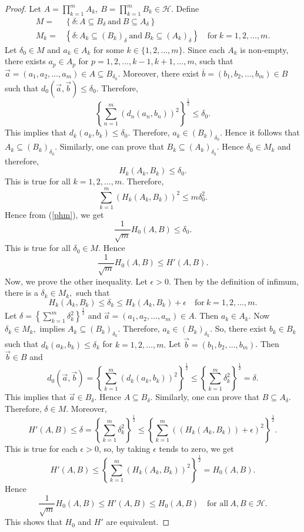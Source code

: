 \documentclass[10pt]{amsart}
\theoremstyle{definition}
\begin{document}
	\begin{proof}
		Let $A=\prod_{k=1}^mA_k,~B=\prod_{k=1}^mB_k\in \mathscr{H}$. Define
		\begin{align*}
			M=&\left\{\delta : A\subseteq B_\delta~\mbox{and}~B\subseteq A_\delta\right\}\\
			M_k=&\left\{\delta : A_k\subseteq (B_k)_\delta~\mbox{and}~B_k\subseteq (A_k)_\delta\right\}\quad \mbox{for}~k=1,2,\ldots,m.
		\end{align*}
		Let $\delta_0\in M$ and $a_k\in A_k$ for some $k\in\{1,2,\ldots,m\}.$ Since each $A_k$ is non-empty,  there exists $a_p\in A_p$ for $p=1,2,\ldots,k-1,k+1,\ldots,m$, such that $\vec{a}=(a_1,a_2,\ldots,a_m)\in A\subseteq B_{\delta_0}$. Moreover, there exist $\overline{b}=(b_1,b_2,\ldots,b_m)\in B$ such that $d_0(\vec{a},\vec{b})\leq \delta_0.$ Therefore,
		$$\left\{\sum_{n=1}^{m}(d_n(a_n,b_n))^2\right \}^{\frac{1}{2}}\leq\delta_0.$$
		This implies that $d_k(a_k,b_k)\leq\delta_0.$ Therefore, $a_k\in(B_k)_{\delta_0}$. Hence it follows that $A_k\subseteq (B_k)_{\delta_0}$. Similarly, one can prove that $B_k\subseteq (A_k)_{\delta_0}$. Hence $\delta_0\in M_k$ and therefore, $$H_k(A_k,B_k)\leq \delta_0.$$ This is true for all $k=1,2,\ldots,m.$ Therefore, $$\sum_{k=1}^{m}(H_k(A_k,B_k))^2\leq m\delta_0^2.$$ Hence from (\ref{phm}), we get $$\frac{1}{\sqrt{m}}H_0(A,B)\leq\delta_0.$$ This is true for all $\delta_0\in M$. Hence
		$$\frac{1}{\sqrt{m}}H_0(A,B)\leq H'(A,B).$$
		Now, we prove the other inequality. Let $\epsilon>0.$ Then by the definition of infimum, there is a $\delta_k\in M_k,$ such that $$H_k(A_k,B_k)\leq\delta_k\leq H_k(A_k,B_k)+\epsilon\quad \mbox{for}~ k=1,2,\ldots,m.$$
		Let $\delta=\left\{\sum_{k=1}^m\delta_k^2\right\}^{\frac{1}{2}}$ and  $\vec{a}=(a_1,a_2,\ldots,a_m)\in A$. Then $a_k\in A_k$. Now $\delta_k\in M_k,$ implies $A_k\subseteq (B_k)_{\delta_k}$. Therefore, $a_k\in (B_k)_{\delta_k}$. So, there exist $b_k\in B_k$ such that $d_k(a_k,b_k)\leq \delta_k$ for $k=1,2,\ldots,m.$ Let $\vec{b}=(b_1,b_2,\ldots,b_m)$. Then $\vec{b}\in B$ and $$d_0(\vec{a},\vec{b})=\left\{\sum_{k=1}^{m}(d_k(a_k,b_k))^2\right \}^{\frac{1}{2}}\leq \left\{\sum_{k=1}^m\delta_k^2\right\}^{\frac{1}{2}}=\delta.$$ This implies that $\vec{a}\in B_\delta$. Hence $A\subseteq B_\delta$. Similarly, one can prove that $B\subseteq A_\delta.$ Therefore, $\delta\in M.$ Moreover, $$H'(A,B)\leq\delta=\left\{\sum_{k=1}^m\delta_k^2\right\}^{\frac{1}{2}}\leq \left\{\sum_{k=1}^{m}((H_k(A_k,B_k))+\epsilon)^2\right\}^{\frac{1}{2}}.$$ This is true for each $\epsilon>0$, so, by taking $\epsilon$ tends to zero, we get
		$$H'(A,B)\leq \left\{\sum_{k=1}^{m}(H_k(A_k,B_k))^2\right\}^{\frac{1}{2}}=H_0(A,B).$$
		Hence $$\frac{1}{\sqrt{m}}H_0(A,B)\leq H'(A,B)\leq H_0(A,B)\quad \mbox{for all}~A,B\in\mathscr{H}.$$
		This shows that $H_0$ and $H'$ are equivalent.
	\end{proof}
\end{document}
